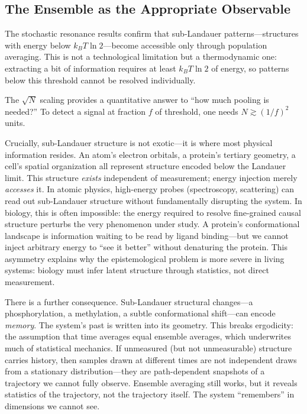 \documentclass[12pt]{article}
\begin{document}
\subsection{The Ensemble as the Appropriate Observable}

The stochastic resonance results confirm that sub-Landauer patterns---structures with energy below $k_B T \ln 2$---become accessible only through population averaging. This is not a technological limitation but a thermodynamic one: extracting a bit of information requires at least $k_B T \ln 2$ of energy, so patterns below this threshold cannot be resolved individually.

The $\sqrt{N}$ scaling provides a quantitative answer to ``how much pooling is needed?'' To detect a signal at fraction $f$ of threshold, one needs $N \gtrsim (1/f)^2$ units.

Crucially, sub-Landauer structure is not exotic---it is where most physical information resides. An atom's electron orbitals, a protein's tertiary geometry, a cell's spatial organization all represent structure encoded below the Landauer limit. This structure \emph{exists} independent of measurement; energy injection merely \emph{accesses} it. In atomic physics, high-energy probes (spectroscopy, scattering) can read out sub-Landauer structure without fundamentally disrupting the system. In biology, this is often impossible: the energy required to resolve fine-grained causal structure perturbs the very phenomenon under study. A protein's conformational landscape is information waiting to be read by ligand binding---but we cannot inject arbitrary energy to ``see it better'' without denaturing the protein. This asymmetry explains why the epistemological problem is more severe in living systems: biology must infer latent structure through statistics, not direct measurement.

There is a further consequence. Sub-Landauer structural changes---a phosphorylation, a methylation, a subtle conformational shift---can encode \emph{memory}. The system's past is written into its geometry. This breaks ergodicity: the assumption that time averages equal ensemble averages, which underwrites much of statistical mechanics. If unmeasured (but not unmeasurable) structure carries history, then samples drawn at different times are not independent draws from a stationary distribution---they are path-dependent snapshots of a trajectory we cannot fully observe. Ensemble averaging still works, but it reveals statistics of the trajectory, not the trajectory itself. The system ``remembers'' in dimensions we cannot see.
\end{document}
